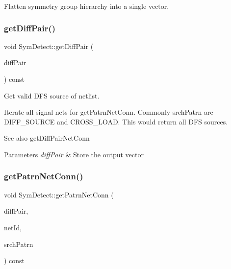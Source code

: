 Flatten symmetry group hierarchy into a single vector. 

\mbox{\label{classSymDetect_af04b93dac7e090cef8e741d8d1812485}} 
\subsubsection{\texorpdfstring{get\+Diff\+Pair()}{getDiffPair()}}
{\footnotesize\ttfamily void Sym\+Detect\+::get\+Diff\+Pair (\begin{DoxyParamCaption}\item[{std\+::vector$<$ \hyperlink{classMosPair}{Mos\+Pair} $>$ \&}]{diff\+Pair }\end{DoxyParamCaption}) const\hspace{0.3cm}{\ttfamily [private]}}



Get valid D\+FS source of netlist. 

Iterate all signal nets for get\+Patrn\+Net\+Conn. Commonly srch\+Patrn are D\+I\+F\+F\+\_\+\+S\+O\+U\+R\+CE and C\+R\+O\+S\+S\+\_\+\+L\+O\+AD. This would return all D\+FS sources.

\begin{DoxySeeAlso}{See also}
get\+Diff\+Pair\+Net\+Conn 
\end{DoxySeeAlso}

\begin{DoxyParams}{Parameters}
{\em diff\+Pair} & Store the output vector \\
\hline
\end{DoxyParams}
\mbox{\label{classSymDetect_aa6d2ec13048f8f7e18e659bf8ac31dee}} 
\subsubsection{\texorpdfstring{get\+Patrn\+Net\+Conn()}{getPatrnNetConn()}}
{\footnotesize\ttfamily void Sym\+Detect\+::get\+Patrn\+Net\+Conn (\begin{DoxyParamCaption}\item[{std\+::vector$<$ \hyperlink{classMosPair}{Mos\+Pair} $>$ \&}]{diff\+Pair,  }\item[{\hyperlink{type_8h_a581e8093e28e7362f2b6937296190676}{Index\+Type}}]{net\+Id,  }\item[{\hyperlink{type_8h_af19eddb079bfea723256710b029c38e8}{Mos\+Pattern}}]{srch\+Patrn }\end{DoxyParamCaption}) const\hspace{0.3cm}{\ttfamily [private]}}



